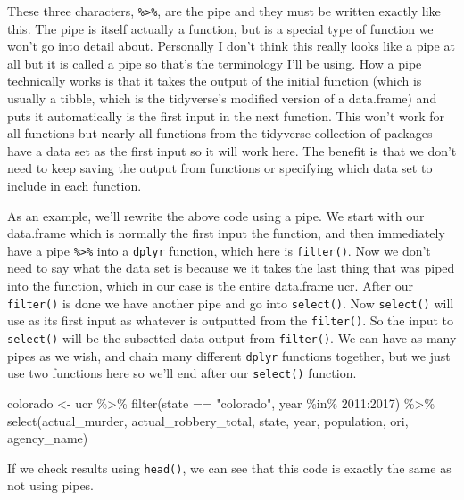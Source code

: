 \documentclass[
]{krantz}
\makeatletter
\newenvironment{Shaded}{\begin{snugshade}}{\end{snugshade}}
\newcommand{\DecValTok}[1]{\textcolor[rgb]{0.06,0.06,0.06}{#1}}
\newcommand{\FunctionTok}[1]{\textcolor[rgb]{0,0,0}{#1}}
\newcommand{\NormalTok}[1]{#1}
\newcommand{\OtherTok}[1]{\textcolor[rgb]{0.37,0.37,0.37}{#1}}
\newcommand{\SpecialCharTok}[1]{\textcolor[rgb]{0,0,0}{#1}}
\newcommand{\StringTok}[1]{\textcolor[rgb]{0.5,0.5,0.5}{#1}}
\newenvironment{kframe}{%
\medskip{}
\setlength{\fboxsep}{.8em}
 \def\at@end@of@kframe{}%
 \ifinner\ifhmode%
  \def\at@end@of@kframe{\end{minipage}}%
  \begin{minipage}{\columnwidth}%
 \fi\fi%
 \def\FrameCommand##1{\hskip\@totalleftmargin \hskip-\fboxsep
 \colorbox{shadecolor}{##1}\hskip-\fboxsep
     \hskip-\linewidth \hskip-\@totalleftmargin \hskip\columnwidth}%
 \MakeFramed {\advance\hsize-\width
   \@totalleftmargin\z@ \linewidth\hsize
   \@setminipage}}%
 {\par\unskip\endMakeFramed%
 \at@end@of@kframe}
\renewenvironment{Shaded}{\begin{kframe}}{\end{kframe}}
\makeatother
\begin{document}
These three characters, \texttt{\%\textgreater{}\%}, are the pipe and they must be written exactly like this. The pipe is itself actually a function, but is a special type of function we won't go into detail about. Personally I don't think this really looks like a pipe at all but it is called a pipe so that's the terminology I'll be using. How a pipe technically works is that it takes the output of the initial function (which is usually a tibble, which is the tidyverse's modified version of a data.frame) and puts it automatically is the first input in the next function. This won't work for all functions but nearly all functions from the tidyverse collection of packages have a data set as the first input so it will work here. The benefit is that we don't need to keep saving the output from functions or specifying which data set to include in each function.

As an example, we'll rewrite the above code using a pipe. We start with our data.frame which is normally the first input the function, and then immediately have a pipe \texttt{\%\textgreater{}\%} into a \texttt{dplyr} function, which here is \texttt{filter()}. Now we don't need to say what the data set is because we it takes the last thing that was piped into the function, which in our case is the entire data.frame ucr. After our \texttt{filter()} is done we have another pipe and go into \texttt{select()}. Now \texttt{select()} will use as its first input as whatever is outputted from the \texttt{filter()}. So the input to \texttt{select()} will be the subsetted data output from \texttt{filter()}. We can have as many pipes as we wish, and chain many different \texttt{dplyr} functions together, but we just use two functions here so we'll end after our \texttt{select()} function.

\begin{Shaded}
\begin{Highlighting}[]
\NormalTok{colorado }\OtherTok{\textless{}{-}}\NormalTok{ ucr }\SpecialCharTok{\%\textgreater{}\%} \FunctionTok{filter}\NormalTok{(state }\SpecialCharTok{==} \StringTok{"colorado"}\NormalTok{, year }\SpecialCharTok{\%in\%} \DecValTok{2011}\SpecialCharTok{:}\DecValTok{2017}\NormalTok{) }\SpecialCharTok{\%\textgreater{}\%}   \FunctionTok{select}\NormalTok{(actual\_murder, actual\_robbery\_total, state, year, population, ori, agency\_name)}
\end{Highlighting}
\end{Shaded}

If we check results using \texttt{head()}, we can see that this code is exactly the same as not using pipes.
\end{document}
